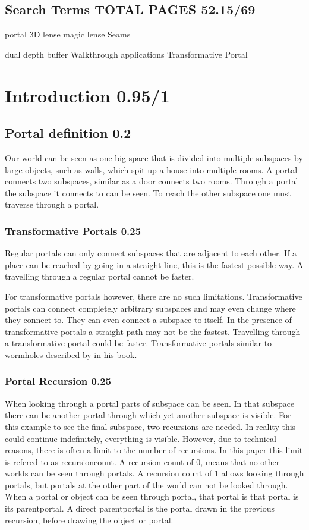 
\subsection*{Search Terms TOTAL PAGES 52.15/69}
portal
3D lense
magic lense
Seams

dual depth buffer
Walkthrough applications
Transformative Portal
\section{Introduction 0.95/1}

\subsection{Portal definition 0.2}
Our world can be seen as one big space that is divided into multiple subspaces by large objects, such as walls, which spit up a house into multiple rooms. A portal connects two subspaces, similar as a door connects two rooms. Through a portal the subspace it connects to can be seen. To reach the other subspace one must traverse through a portal.

\subsubsection{Transformative Portals 0.25}
Regular portals can only connect subspaces that are adjacent to each other. If a place can be reached by going in a straight line, this is the fastest possible way. A travelling through a regular portal cannot be faster.

For transformative portals however, there are no such limitations. Transformative portals can connect completely arbitrary subspaces and may even change where they connect to. They can even connect a subspace to itself. In the presence of transformative portals a straight path may not be the fastest. Travelling through a transformative portal could be faster. Transformative portals similar to wormholes described by \textcite{Visser:Wormholes} in his book.

\subsubsection{Portal Recursion 0.25}
When looking through a portal parts of subspace can be seen. In that subspace there can be another portal through which yet another subspace is visible. For this example to see the final subspace, two recursions are needed. In reality this could continue indefinitely, everything is visible. However, due to technical reasons, there is often a limit to the number of recursions. In this paper this limit is refered to as \gls{recursioncount}. A recursion count of 0, means that no other worlds can be seen through portals. A recursion count of 1 allows looking through portals, but portals at the other part of the world can not be looked through. When a portal or object can be seen through portal, that portal is that portal is its \gls{parentportal}. A direct \gls{parentportal} is the portal drawn in the previous recursion, before drawing the object or portal.

